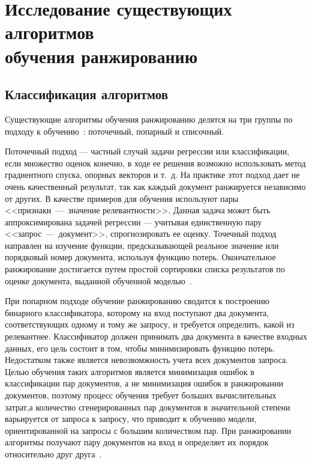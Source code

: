 \chapter[Исследование существующих алгоритмов обучения\\ранжированию]{Исследование существующих алгоритмов \\обучения ранжированию}

\section{Классификация алгоритмов}

Существующие алгоритмы обучения ранжированию делятся на три группы по подходу к обучению~\cite{ML_for_SE}: поточечный, попарный и списочный.

Поточечный подход --- частный случай задачи регрессии или классификации, если множество оценок конечно, в ходе ее решения возможно использовать метод градиентного спуска, опорных векторов и т.~д. На практике этот подход дает не очень качественный результат, так как каждый документ ранжируется независимо от других. В качестве примеров для обучения используют пары <<признаки~---~значение релевантности>>. Данная задача может быть аппроксимирована задачей регрессии --- учитывая единственную пару <<запрос~---~документ>>, спрогнозировать ее оценку. Точечный подход направлен на изучение функции, предсказывающей реальное значение или порядковый номер документа, используя функцию потерь. Окончательное ранжирование достигается путем простой сортировки списка результатов по оценке документа, выданной обученной моделью~\cite{LR_BOOK}.

При попарном подходе обучение ранжированию сводится к построению бинарного классификатора, которому на вход поступают два документа, соответствующих одному и тому же запросу, и требуется определить, какой из релевантнее. Классификатор должен принимать два документа в качестве входных данных, его цель состоит в том, чтобы минимизировать функцию потерь. Недостатком также является невозвомжность учета всех документов запроса. Целью обучения таких алгоритмов является минимизация ошибок в классификации пар документов, а не минимизация ошибок в ранжировании документов, поэтому процесс обучения требует больших вычислительных затрат,а количество сгенерированных пар документов в значительной степени варьируется от запроса к запросу, что приводит к обучению модели, ориентированной на запросы с большим количеством пар. При ранжировании алгоритмы получают пару документов на вход и определяет их порядок относительно друг друга~\cite{LR_BOOK}.

